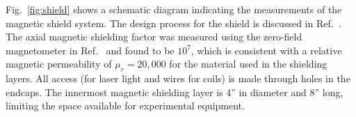 Fig.~\ref{fig:shield} shows a schematic diagram indicating the
measurements of the magnetic shield system.  The design process for
the shield is discussed in Ref.~\cite{Martin:2014foa}.  The axial magnetic
shielding factor was measured using the zero-field magnetometer in
Ref.~\cite{Martin:2014foa} and found to be $10^7$, which is consistent with
a relative magnetic permeability of $\mu_r=20,000$ for the material
used in the shielding layers.  All access (for laser light and wires
for coils) is made through holes in the endcaps.  The innermost
magnetic shielding layer is 4'' in diameter and 8'' long, limiting the
space available for experimental equipment.




